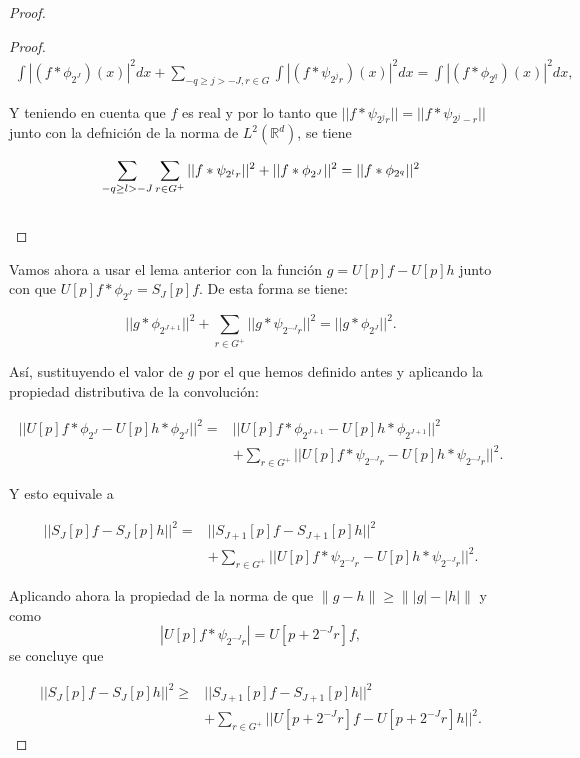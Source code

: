 \begin{proof}
\begin{proof}
  \begin{align*}
    \int \left|(f \ast \phi_{2^J}) (x)\right|^2 dx + \sum_{-q \geq j >-J,r \in G} \int \left|(f \ast \psi_{2^{j}r})(x)\right|^2 dx=\int \left|(f \ast \phi_{2^q}) (x)\right|^2 dx,
  \end{align*}

  \noindent Y teniendo en cuenta que $f$ es real y por lo tanto que $||f \ast \psi_{2^j r}||= ||f \ast \psi_{2^j -r}||$ junto con la defnición de la norma de $L^2(\mathbb{R}^d)$, se tiene  

  \begin{align*}
    \sum_{-q\geq l > -J} \sum_{r \in G^+} || f \ast \psi_{2^lr}||^2 + || f \ast \phi_{2^J}||^2 = || f \ast \phi_{2^q} ||^2& \\ 
    &\qedhere
  \end{align*} 

\end{proof}


Vamos ahora a usar el lema anterior con la función $g=U[p]f-U[p]h$ junto con que $U[p]f\ast \phi_{2^J}=S_J[p]f$. De esta forma se tiene:

$$||g \ast \phi_{2^{J+1}} ||^2 + \sum_{r\in G^+} || g\ast \psi_{2^{-J}r} ||^2=||g \ast \phi_{2^J}||^2.$$

\noindent Así, sustituyendo el valor de $g$ por el que hemos definido antes y aplicando la propiedad distributiva de la convolución:

\begin{align*}
  ||U[p]f \ast \phi_{2^J} -U[p]h \ast \phi_{2^J}||^2 = &||U[p]f \ast \phi_{2^{J+1}} - U[p]h \ast \phi_{2^{J+1}} ||^2 \\
  & + \sum_{r\in G^+} || U[p]f\ast \psi_{2^{-J}r} -U[p]h \ast \psi_{2^{-J}r}||^2.
\end{align*}

\noindent Y esto equivale a

\begin{align*}
  ||S_{J}[p]f-S_J[p]h||^2 = &|| S_{J+1}[p]f-S_{J+1}[p]h||^2 \\
  & + \sum_{r\in G^+} || U[p]f\ast \psi_{2^{-J}r} -U[p]h \ast \psi_{2^{-J}r}||^2.
\end{align*}

\noindent Aplicando ahora la propiedad de la norma de que $\|g - h \| \geq \| |g| - |h| \|$ y como $$|U[p]f\ast\psi_{2^{-J}r}|=U[p+2^{-J}r]f,$$ se concluye que

\begin{align*}
    ||S_{J}[p]f-S_J[p]h||^2 \geq & || S_{J+1}[p]f-S_{J+1}[p]h||^2 \\
    & + \sum_{r\in G^+} ||U[p+2^{-J}r]f-U[p+2^{-J}r]h||^2.
\end{align*}



\end{proof}
